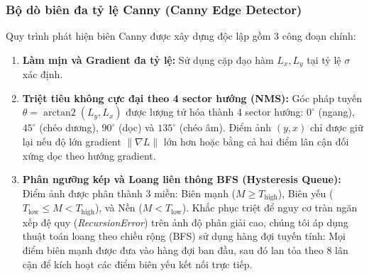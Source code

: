 \documentclass[conference]{IEEEtran}
\begin{document}
\subsubsection{Bộ dò biên đa tỷ lệ Canny (Canny Edge Detector)}
Quy trình phát hiện biên Canny \cite{canny1986computational} được xây dựng độc lập gồm 3 công đoạn chính:
\begin{enumerate}
    \item \textbf{Làm mịn và Gradient đa tỷ lệ:} Sử dụng cặp đạo hàm $L_x, L_y$ tại tỷ lệ $\sigma$ xác định.
    \item \textbf{Triệt tiêu không cực đại theo 4 sector hướng (NMS):} Góc pháp tuyến $\theta = \operatorname{arctan2}(L_y, L_x)$ được lượng tử hóa thành 4 sector hướng: $0^\circ$ (ngang), $45^\circ$ (chéo dương), $90^\circ$ (dọc) và $135^\circ$ (chéo âm). Điểm ảnh $(y, x)$ chỉ được giữ lại nếu độ lớn gradient $\|\nabla L\|$ lớn hơn hoặc bằng cả hai điểm lân cận đối xứng dọc theo hướng gradient.
    \item \textbf{Phân ngưỡng kép và Loang liên thông BFS (Hysteresis Queue):} Điểm ảnh được phân thành 3 miền: Biên mạnh ($M \ge T_{\text{high}}$), Biên yếu ($T_{\text{low}} \le M < T_{\text{high}}$), và Nền ($M < T_{\text{low}}$). Khắc phục triệt để nguy cơ tràn ngăn xếp đệ quy (\textit{RecursionError}) trên ảnh độ phân giải cao, chúng tôi áp dụng thuật toán loang theo chiều rộng (BFS) sử dụng hàng đợi tuyến tính: Mọi điểm biên mạnh được đưa vào hàng đợi ban đầu, sau đó lan tỏa theo 8 lân cận để kích hoạt các điểm biên yếu kết nối trực tiếp.
\end{enumerate}
\end{document}
